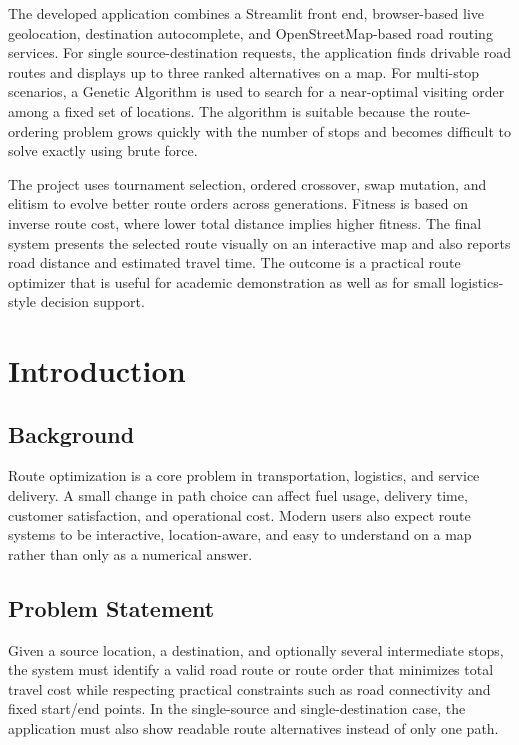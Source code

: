 The developed application combines a Streamlit front end, browser-based live geolocation, destination autocomplete, and OpenStreetMap-based road routing services. For single source-destination requests, the application finds drivable road routes and displays up to three ranked alternatives on a map. For multi-stop scenarios, a Genetic Algorithm is used to search for a near-optimal visiting order among a fixed set of locations. The algorithm is suitable because the route-ordering problem grows quickly with the number of stops and becomes difficult to solve exactly using brute force.

The project uses tournament selection, ordered crossover, swap mutation, and elitism to evolve better route orders across generations. Fitness is based on inverse route cost, where lower total distance implies higher fitness. The final system presents the selected route visually on an interactive map and also reports road distance and estimated travel time. The outcome is a practical route optimizer that is useful for academic demonstration as well as for small logistics-style decision support.

\newpage
\tableofcontents
\newpage
\listoffigures
\newpage
\listoftables
\newpage
{}

\section{Introduction}
\subsection{Background}
Route optimization is a core problem in transportation, logistics, and service delivery. A small change in path choice can affect fuel usage, delivery time, customer satisfaction, and operational cost. Modern users also expect route systems to be interactive, location-aware, and easy to understand on a map rather than only as a numerical answer.

\subsection{Problem Statement}
Given a source location, a destination, and optionally several intermediate stops, the system must identify a valid road route or route order that minimizes total travel cost while respecting practical constraints such as road connectivity and fixed start/end points. In the single-source and single-destination case, the application must also show readable route alternatives instead of only one path.

